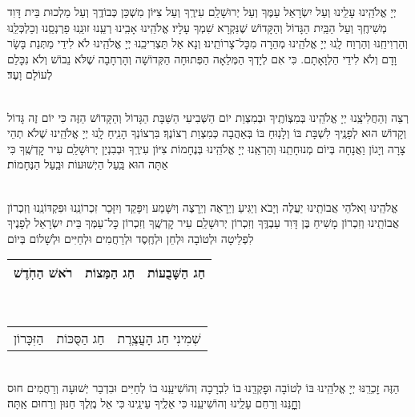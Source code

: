 \documentclass[twoside, openany, parskip=half, 11pt]{book}
\begin{document}
יְיָ אֱלֹהֵֽינוּ עָלֵֽינוּ וְעַל יִשְׂרָאֵל עַמֶּךָ וְעַל יְרוּשָׁלַ‍ִם עִירֶֽךָ וְעַל צִיּוֹן מִשְׁכַּן כְּבוֹדֶֽךָ וְעַל מַלְכוּת בֵּית דָּוִד מְשִׁיחֶֽךָ וְעַל הַבַּֽיִת הַגָּדוֹל וְהַקָּדוֹשׁ שֶׁנִּקְרָא שִׁמְךָ עָלָיו׃ אֱלֹהֵֽינוּ אָבִֽינוּ רְעֵֽנוּ זוּנֵֽנוּ פַרְנְסֵֽנוּ וְכַלְכְּלֵֽנוּ וְהַרְוִיחֵֽנוּ וְהַרְוַח לָֽנוּ יְיָ אֱלֹהֵֽינוּ מְהֵרָה מִכׇּל־צָרוֹתֵֽינוּ׃ וְנָא אַל תַּצְרִיכֵֽנוּ יְיָ אֱלֹהֵֽינוּ לֹא לִידֵי מַתְּנַת בָּשָׂר וָדָם וְלֹא לִידֵי הַלְוָאָתָם. כִּי אִם לְיָדְךָ הַמְּלֵאָה הַפְּתוּחָה הַקְּדוֹשָׁה וְהָרְחָבָה שֶׁלֹּא נֵבוֹשׁ וְלֹא נִכָּלֵם לְעוֹלָם וָעֶד׃

\enlargethispage{\baselineskip}

\vspace{-.25\baselineskip}
\begin{sometimes}

\shabbos\\
רְצֵה וְהַחֲלִיצֵֽנוּ יְיָ אֱלֹהֵֽינוּ בְּמִצְוֹתֶֽיךָ וּבְמִצְוַת יוֹם הַשְּׁבִיעִי הַשַּׁבָּת הַגָּדוֹל וְהַקָּדוֹשׁ הַזֶּה כִּי יוֹם זֶה גָּדוֹל וְקָדוֹשׁ הוּא לְפָנֶֽיךָ לִשְׁבָּת בּוֹ וְלָנֽוּחַ בּוֹ בְּאַהֲבָה כְּמִצְוַת רְצוֹנֶךָ׃ בִּרְצוֹנְךָ הָנִֽיחַ לָֽנוּ יְיָ אֱלֹהֵֽינוּ שֶׁלֹא תְהֵי צָרָה וְיָגוֹן וַאֲנָחָה בְּיוֹם מְנוּחָתֵֽנוּ וְהַרְאֵֽנוּ יְיָ אֱלֹהֵֽינוּ בְּנֶחָמוֹת צִיּוֹן עִירֶֽךָ וּבְבִנְיַן יְרוּשָׁלַ‍ִם עִיר קׇדְשֶֽׁךָ כִּי אַתָּה הוּא בַּֽעַל הַיְשׁוּעוֹת וּבַֽעַל הַנֶּחָמוֹת׃


\sepline %

\vspace{-.25\baselineskip}
\\
אֱלֹהֵֽינוּ וֵאלֹהֵי אֲבוֹתֵֽינוּ יַעֲלֶה וְיָבֹא וְיַגִּיעַ וְיֵרָאֶה וְיֵרָצֶה וְיִשָּׁמַע וְיִפָּקֵד וְיִזָּכֵר זִכְרוֹנֵֽנוּ וּפִקְדּוֹנֵֽנוּ וְזִכְרוֹן אֲבוֹתֵֽינוּ וְזִכְרוֹן מָשִׁיחַ בֶּן דָּוִד עַבְדֶּֽךָ וְזִכְרוֹן יְרוּשָׁלַ‍ִם עִיר קׇדְשֶֽׁךָ וְזִכְרוֹן כׇּל־עַמְּךָ בֵּית יִשְׂרָאֵל לְפָנֶיךָ לִפְלֵיטָה וּלְטוֹבָה וּלְחֵן וּלְחֶֽסֶד וּלְרַחֲמִים וּלְחַיִּים וּלְשָׁלוֹם בְּיוֹם\\
\begin{tabular}{c|c|c}
רֹאשׁ הַחֹֽדֶשׁ & חַג הַמַּצוֹת & חַג הַשָּׁבֻעוֹת\\ \hline
\end{tabular}\\
\begin{tabular}{c|c|c}
הַזִּכָּרוֹן & חַג הַסֻּכּוֹת & שְׁמִינִי חַג הָעֲצֶֽרֶת
\end{tabular}\\
הַזֶּה זׇכְרֵֽנּוּ יְיָ אֱלֹהֵֽינוּ בּוֹ לְטוֹבָה וּפׇקְדֵֽנוּ בוֹ לִבְרָכָה וְהוֹשִׁיעֵֽנוּ בוֹ לְחַיִּים וּבִדְבַר יְשׁוּעָה וְרַחֲמִים חוּס וְחׇׇׇׇנֵּנוּ וְרַחֵם עָלֵֽינוּ וְהוֹשִׁיעֵֽנוּ כִּי אֵלֶֽיךָ עֵינֵֽינוּ כִּי אֵל מֶֽלֶךְ חַנּוּן וְרַחוּם אַֽתָּה׃

\end{sometimes}
\end{document}
